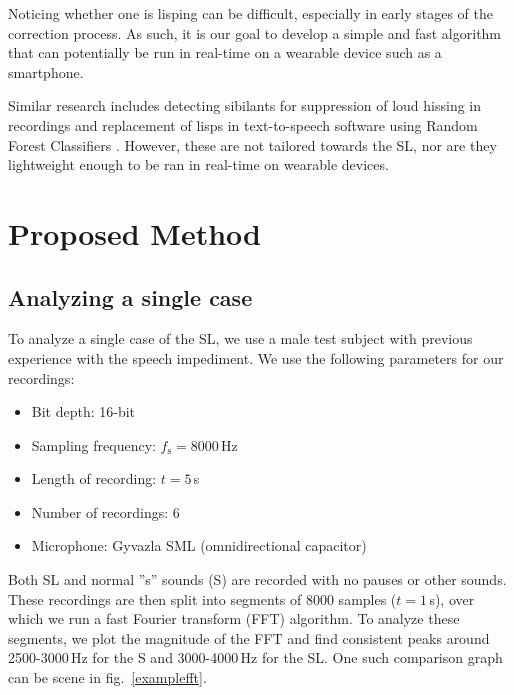 \documentclass{IEEEtran}
\begin{document}
Noticing whether one is lisping can be difficult,
especially in early stages of the correction process.
As such,
it is our goal to develop a simple and fast algorithm that can potentially be run in real-time on a wearable device such as a smartphone.

Similar research includes detecting sibilants for suppression of loud hissing in recordings \cite{Gonzalez} \cite{de-ess} and replacement of lisps in text-to-speech software using Random Forest Classifiers \cite{Itagi}.
However,
these are not tailored towards the SL,
nor are they lightweight enough to be ran in real-time on wearable devices.

\section{Proposed Method}

\subsection{Analyzing a single case}\label{analyze}

To analyze a single case of the SL,
we use a male test subject with previous experience with the speech impediment.
We use the following parameters for our recordings:

\begin{itemize}
	\item Bit depth: 16-bit
	\item Sampling frequency: \(f_\mathrm{s} = 8000\)\,Hz
	\item Length of recording: \(t = 5\)\,s
	\item Number of recordings: 6
	\item Microphone: Gyvazla SML (omnidirectional capacitor)
\end{itemize}

Both SL and normal ''s'' sounds (S) are recorded with no pauses or other sounds.
These recordings are then split into segments of 8000 samples (\(t = 1\)\,s),
over which we run a fast Fourier transform (FFT) algorithm.
To analyze these segments, we plot the magnitude of the FFT and find consistent peaks around 2500-3000\,Hz for the S and 3000-4000\,Hz for the SL.
One such comparison graph can be scene in fig.\ \ref{examplefft}.
\end{document}
